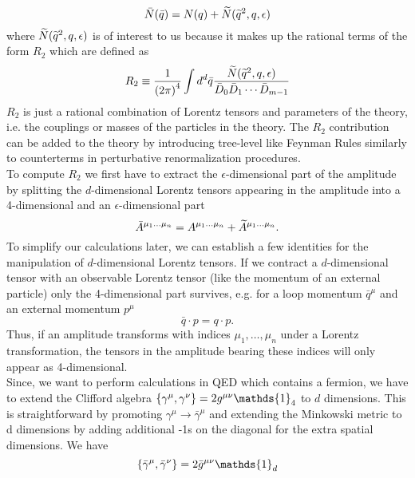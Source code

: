 \begin{equation}
\bar{N}( \bar{q}) = N (q) + \widetilde{N} (\widetilde{q}^2,q,\epsilon)
\end{equation}
where $\widetilde{N} (\widetilde{q}^2,q,\epsilon)$ is of interest to us because it makes up the rational terms of the form $R_2$ which are defined as
\begin{equation}
\label{eqn:R2}
R_2 \equiv \frac{1}{\left( 2\pi \right)^4} \int d^d \bar{q} \frac{\widetilde{N} ( \widetilde{q}^2,q,\epsilon)}{\bar{D}_0\bar{D}_1\cdots\bar{D}_{m-1}}
\end{equation} 
$R_2$ is just a rational combination of Lorentz tensors and parameters of the theory, i.e. the couplings or masses of the particles in the theory. The $R_2$ contribution can be added to the theory by introducing tree-level like Feynman Rules similarly to counterterms in perturbative renormalization procedures. \\
To compute $R_2$ we first have to extract the $\epsilon$-dimensional part of the amplitude by splitting the $d$-dimensional Lorentz tensors appearing in the amplitude into a 4-dimensional and an $\epsilon$-dimensional part
\begin{equation}
\bar{A}^{\mu_1\dots\mu_n} = A^{\mu_1\dots\mu_n} + \widetilde{A}^{\mu_1\dots\mu_n}.
\end{equation}
To simplify our calculations later, we can establish a few identities for the manipulation of $d$-dimensional Lorentz tensors. If we contract a $d$-dimensional tensor with an observable Lorentz tensor (like the momentum of an external particle) only the 4-dimensional part survives, e.g. for a loop momentum $\bar{q}^{\mu}$ and an external momentum $p^{\mu}$
\begin{equation}
\bar{q}\cdot p = q \cdot p.
\end{equation}
Thus, if an amplitude transforms with indices $\mu_1,\dots,\mu_n$ under a Lorentz transformation, the tensors in the amplitude bearing these indices will only appear as 4-dimensional. \\
Since, we want to perform calculations in QED which contains a fermion, we have to extend the Clifford algebra $\lbr \gamma^{\mu},\gamma^{\nu} \rbr = 2g^{\mu\nu} \mathds{1}_4$ to $d$ dimensions. This is straightforward by promoting $\gamma^{\mu} \rightarrow \bar{\gamma}^{\mu}$ and extending the Minkowski metric to d dimensions by adding additional -1s on the diagonal for the extra spatial dimensions. We have
\begin{equation}
\lbr \bar{\gamma}^{\mu},\bar{\gamma}^{\nu} \rbr = 2\bar{g}^{\mu\nu} \mathds{1}_d
\end{equation}
